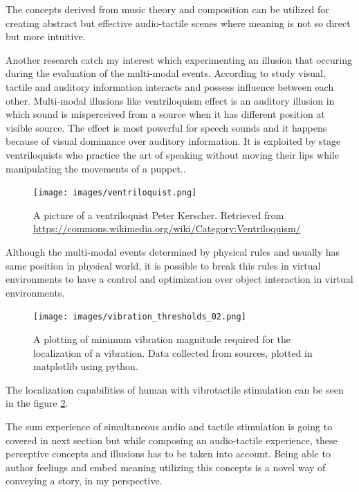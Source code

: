             The concepts derived from music theory and composition can be utilized for creating abstract but effective audio-tactile scenes where meaning is not so direct but more intuitive.\par

            Another research\cite{Touch_the_Sound} catch my interest which experimenting an illusion that occuring during the evaluation of the multi-modal events. According to study visual, tactile and auditory information interacts and possess influence between each other. Multi-modal illusions like ventriloquism effect is an auditory illusion in which sound is misperceived from a source when it has different position at visible source. The effect is most powerful for speech sounds and it happens because of visual dominance over auditory information. It is exploited by stage ventriloquists who practice the art of speaking without moving their lips while manipulating the movements of a puppet.\cite{Touch_the_Sound}.\par
            
            \begin{figure}[H]
                \centering
                \texttt{[image: images/ventriloquist.png]}
                \caption{A picture of a ventriloquist Peter Kerscher. Retrieved from \url{https://commons.wikimedia.org/wiki/Category:Ventriloquism/}}
                \label{fig:VENTRILOQUIST}
            \end{figure}

            Although the multi-modal events determined by physical rules and usually has same position in physical world, it is possible to break this rules in virtual environments to have a control and optimization over object interaction in virtual environments.

            \begin{figure}[H]
                \centering
                \texttt{[image: images/vibration\_thresholds\_02.png]}
                \caption{A plotting of minimum vibration magnitude required for the localization of a vibration. Data collected from sources\cite{Haptic_Perception-A_Tutorial}, plotted in matplotlib using python.}
                \label{fig:VIB_THRESHOLD_02}
            \end{figure}            

            The localization capabilities of human with vibrotactile stimulation can be seen in the figure \ref{fig:VIB_THRESHOLD_02}.

            The sum experience of simultaneous audio and tactile stimulation is going to covered in next section but while composing an audio-tactile experience, these perceptive concepts and illusions has to be taken into account. Being able to author feelings and embed meaning utilizing this concepts is a novel way of conveying a story, in my perspective.\par
